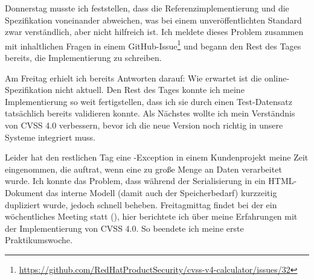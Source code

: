 \sweekdaymarginpar{\weekdayThursdayLong}

Donnerstag musste ich feststellen, dass die Referenzimplementierung und die Spezifikation voneinander abweichen, was bei einem unveröffentlichten Standard zwar verständlich, aber nicht hilfreich ist.
Ich meldete dieses Problem zusammen mit inhaltlichen Fragen in einem GitHub-Issue\footnote{\url{https://github.com/RedHatProductSecurity/cvss-v4-calculator/issues/32}} und begann den Rest des Tages bereits, die Implementierung zu schreiben.

\sweekdaymarginpar{\weekdayFridayLong}

Am Freitag erhielt ich bereits Antworten darauf:
Wie erwartet ist die online-Spezifikation nicht aktuell.
Den Rest des Tages konnte ich meine Implementierung so weit fertigstellen, dass ich sie durch einen Test-Datensatz tatsächlich bereits validieren konnte.
Als Nächstes wollte ich mein Verständnis von CVSS 4.0 verbessern, bevor ich die neue Version noch richtig in unsere Systeme integriert muss.

Leider hat den restlichen Tag eine -Exception in einem Kundenprojekt meine Zeit eingenommen, die auftrat, wenn eine zu große Menge an Daten verarbeitet wurde.
Ich konnte das Problem, dass während der Serialisierung in ein HTML-Dokument das interne Modell (damit auch der Speicherbedarf) kurzzeitig dupliziert wurde, jedoch schnell beheben.
Freitagmittag findet bei der {\metaeffekt} ein wöchentliches Meeting statt (), hier berichtete ich über meine Erfahrungen mit der Implementierung von CVSS 4.0.
So beendete ich meine erste Praktikumswoche.

